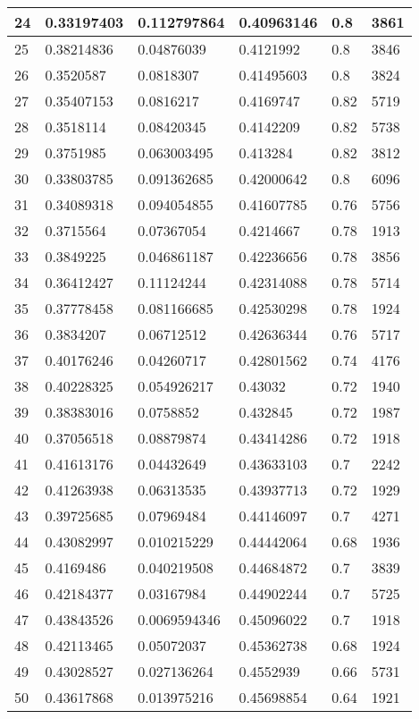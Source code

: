 \begin{longtable}{|l|l|l|l|l|l|}
24 & 0.33197403 & 0.112797864 & 0.40963146 & 0.8 & 3861 \\ \hline 
25 & 0.38214836 & 0.04876039 & 0.4121992 & 0.8 & 3846 \\ \hline 
26 & 0.3520587 & 0.0818307 & 0.41495603 & 0.8 & 3824 \\ \hline 
27 & 0.35407153 & 0.0816217 & 0.4169747 & 0.82 & 5719 \\ \hline 
28 & 0.3518114 & 0.08420345 & 0.4142209 & 0.82 & 5738 \\ \hline 
29 & 0.3751985 & 0.063003495 & 0.413284 & 0.82 & 3812 \\ \hline 
30 & 0.33803785 & 0.091362685 & 0.42000642 & 0.8 & 6096 \\ \hline 
31 & 0.34089318 & 0.094054855 & 0.41607785 & 0.76 & 5756 \\ \hline 
32 & 0.3715564 & 0.07367054 & 0.4214667 & 0.78 & 1913 \\ \hline 
33 & 0.3849225 & 0.046861187 & 0.42236656 & 0.78 & 3856 \\ \hline 
34 & 0.36412427 & 0.11124244 & 0.42314088 & 0.78 & 5714 \\ \hline 
35 & 0.37778458 & 0.081166685 & 0.42530298 & 0.78 & 1924 \\ \hline 
36 & 0.3834207 & 0.06712512 & 0.42636344 & 0.76 & 5717 \\ \hline 
37 & 0.40176246 & 0.04260717 & 0.42801562 & 0.74 & 4176 \\ \hline 
38 & 0.40228325 & 0.054926217 & 0.43032 & 0.72 & 1940 \\ \hline 
39 & 0.38383016 & 0.0758852 & 0.432845 & 0.72 & 1987 \\ \hline 
40 & 0.37056518 & 0.08879874 & 0.43414286 & 0.72 & 1918 \\ \hline 
41 & 0.41613176 & 0.04432649 & 0.43633103 & 0.7 & 2242 \\ \hline 
42 & 0.41263938 & 0.06313535 & 0.43937713 & 0.72 & 1929 \\ \hline 
43 & 0.39725685 & 0.07969484 & 0.44146097 & 0.7 & 4271 \\ \hline 
44 & 0.43082997 & 0.010215229 & 0.44442064 & 0.68 & 1936 \\ \hline 
45 & 0.4169486 & 0.040219508 & 0.44684872 & 0.7 & 3839 \\ \hline 
46 & 0.42184377 & 0.03167984 & 0.44902244 & 0.7 & 5725 \\ \hline 
47 & 0.43843526 & 0.0069594346 & 0.45096022 & 0.7 & 1918 \\ \hline 
48 & 0.42113465 & 0.05072037 & 0.45362738 & 0.68 & 1924 \\ \hline 
49 & 0.43028527 & 0.027136264 & 0.4552939 & 0.66 & 5731 \\ \hline 
50 & 0.43617868 & 0.013975216 & 0.45698854 & 0.64 & 1921 \\ \hline 
\end{longtable}